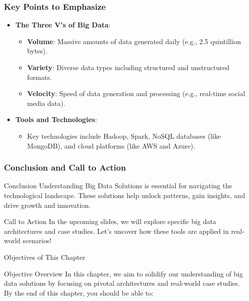 \documentclass[aspectratio=169]{beamer}
\begin{document}
\begin{frame}[fragile]
    \frametitle{Key Points to Emphasize}
    \begin{itemize}
        \item \textbf{The Three V's of Big Data}:
            \begin{itemize}
                \item \textbf{Volume}: Massive amounts of data generated daily (e.g., 2.5 quintillion bytes).
                \item \textbf{Variety}: Diverse data types including structured and unstructured formats.
                \item \textbf{Velocity}: Speed of data generation and processing (e.g., real-time social media data).
            \end{itemize}
        
        \item \textbf{Tools and Technologies}:
            \begin{itemize}
                \item Key technologies include Hadoop, Spark, NoSQL databases (like MongoDB), and cloud platforms (like AWS and Azure).
            \end{itemize}
    \end{itemize}
\end{frame}

\begin{frame}[fragile]
    \frametitle{Conclusion and Call to Action}
    \begin{block}{Conclusion}
        Understanding Big Data Solutions is essential for navigating the technological landscape. These solutions help unlock patterns, gain insights, and drive growth and innovation.
    \end{block}
    
    \begin{block}{Call to Action}
        In the upcoming slides, we will explore specific big data architectures and case studies. Let's uncover how these tools are applied in real-world scenarios!
    \end{block}
\end{frame}

\begin{frame}[fragile]{Objectives of This Chapter}
    \begin{block}{Objective Overview}
        In this chapter, we aim to solidify our understanding of big data solutions by focusing on pivotal architectures and real-world case studies. By the end of this chapter, you should be able to:
    \end{block}
\end{frame}
\end{document}
